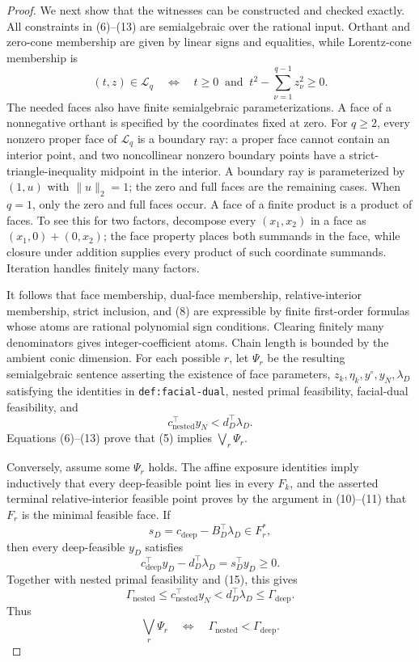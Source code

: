 \documentclass{article}
\begin{document}
\begin{proof}
We next show that the witnesses can be constructed and checked exactly.  All constraints in (6)--(13) are semialgebraic over the rational input.  Orthant and zero-cone membership are given by linear signs and equalities, while Lorentz-cone membership is
\[
 (t,z)\in\mathcal L_q
 \quad\Longleftrightarrow\quad
 t\geq0\ \text{ and }\ t^2-\sum_{\nu=1}^{q-1}z_\nu^2\geq0.          \tag{14}
\]
The needed faces also have finite semialgebraic parameterizations.  A face of a nonnegative orthant is specified by the coordinates fixed at zero.  For \(q\geq2\), every nonzero proper face of \(\mathcal L_q\) is a boundary ray: a proper face cannot contain an interior point, and two noncollinear nonzero boundary points have a strict-triangle-inequality midpoint in the interior.  A boundary ray is parameterized by \((1,u)\) with \(\|u\|_2=1\); the zero and full faces are the remaining cases.  When \(q=1\), only the zero and full faces occur.  A face of a finite product is a product of faces.  To see this for two factors, decompose every \((x_1,x_2)\) in a face as \((x_1,0)+(0,x_2)\); the face property places both summands in the face, while closure under addition supplies every product of such coordinate summands.  Iteration handles finitely many factors.

It follows that face membership, dual-face membership, relative-interior membership, strict inclusion, and (8) are expressible by finite first-order formulas whose atoms are rational polynomial sign conditions.  Clearing finitely many denominators gives integer-coefficient atoms.  Chain length is bounded by the ambient conic dimension.  For each possible \(r\), let \(\Psi_r\) be the resulting semialgebraic sentence asserting the existence of face parameters, \(z_k,\eta_k,y^\circ,y_N,\lambda_D\) satisfying the identities in \texttt{def:facial-dual}, nested primal feasibility, facial-dual feasibility, and
\[
 c_{\mathrm{nested}}^{\top}y_N
 <d_D^{\top}\lambda_D.                                                  \tag{15}
\]
Equations (6)--(13) prove that (5) implies \(\bigvee_r\Psi_r\).

Conversely, assume some \(\Psi_r\) holds.  The affine exposure identities imply inductively that every deep-feasible point lies in every \(F_k\), and the asserted terminal relative-interior feasible point proves by the argument in (10)--(11) that \(F_r\) is the minimal feasible face.  If
\[
 s_D=c_{\mathrm{deep}}-B_D^{\top}\lambda_D\in F_r^*,
\]
then every deep-feasible \(y_D\) satisfies
\[
 c_{\mathrm{deep}}^{\top}y_D-d_D^{\top}\lambda_D
 =s_D^{\top}y_D\geq0.                                                   \tag{16}
\]
Together with nested primal feasibility and (15), this gives
\[
 \Gamma_{\mathrm{nested}}
 \leq c_{\mathrm{nested}}^{\top}y_N
 <d_D^{\top}\lambda_D
 \leq\Gamma_{\mathrm{deep}}.                                           \tag{17}
\]
Thus
\[
 \bigvee_r\Psi_r
 \quad\Longleftrightarrow\quad
 \Gamma_{\mathrm{nested}}<\Gamma_{\mathrm{deep}}.                     \tag{18}
\]


\end{proof}
\end{document}
